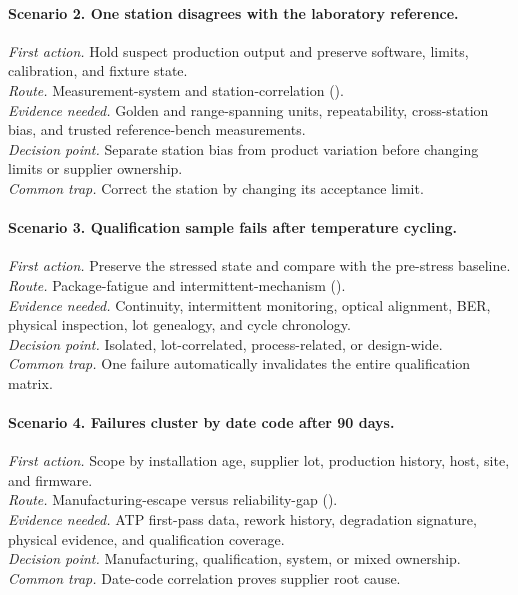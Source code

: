 \paragraph{Scenario 2. One station disagrees with the laboratory reference.}
\textit{First action.} Hold suspect production output and preserve software,
limits, calibration, and fixture state.\\
\textit{Route.} Measurement-system and station-correlation
().\\
\textit{Evidence needed.} Golden and range-spanning units, repeatability,
cross-station bias, and trusted reference-bench measurements.\\
\textit{Decision point.} Separate station bias from product variation before
changing limits or supplier ownership.\\
\textit{Common trap.} Correct the station by changing its acceptance limit.

\paragraph{Scenario 3. Qualification sample fails after temperature cycling.}
\textit{First action.} Preserve the stressed state and compare with the
pre-stress baseline.\\
\textit{Route.} Package-fatigue and intermittent-mechanism
().\\
\textit{Evidence needed.} Continuity, intermittent monitoring, optical
alignment, BER, physical inspection, lot genealogy, and cycle chronology.\\
\textit{Decision point.} Isolated, lot-correlated, process-related, or
design-wide.\\
\textit{Common trap.} One failure automatically invalidates the entire
qualification matrix.

\paragraph{Scenario 4. Failures cluster by date code after 90 days.}
\textit{First action.} Scope by installation age, supplier lot, production
history, host, site, and firmware.\\
\textit{Route.} Manufacturing-escape versus reliability-gap
().\\
\textit{Evidence needed.} ATP first-pass data, rework history, degradation
signature, physical evidence, and qualification coverage.\\
\textit{Decision point.} Manufacturing, qualification, system, or mixed
ownership.\\
\textit{Common trap.} Date-code correlation proves supplier root cause.


